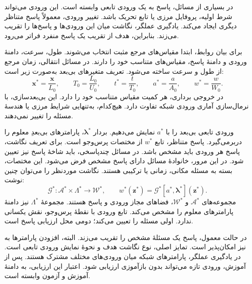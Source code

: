 \label{sec:lit-operator-learning}

\label{sec:lit-operator-concept}

در بسیاری از مسائل، پاسخ به یک ورودی تابعی وابسته است.
این ورودی می‌تواند شرط اولیه، پروفایل مرزی یا تابع تحریک باشد.
تغییر ورودی، معمولاً پاسخ متناظر دیگری ایجاد می‌کند.
یادگیری عملگر، نگاشت میان این ورودی‌ها و پاسخ‌ها را تقریب می‌زند.
بنابراین، هدف از تقریب یک پاسخ منفرد فراتر می‌رود.
\cite{Kovachki2023NeuralOperator}

برای بیان روابط، ابتدا مقیاس‌های مرجع مثبت انتخاب می‌شوند.
طول، سرعت، دامنهٔ ورودی و دامنهٔ پاسخ، مقیاس‌های متناسب خود را دارند.
در مسائل انتقالی، زمان مرجع از طول و سرعت ساخته می‌شود.
تعریف متغیرهای بی‌بعد به‌صورت زیر است:
\begin{equation}
\mathbf{x}^{*}=\frac{\mathbf{x}}{L_0},
\qquad T_0=\frac{L_0}{U_0},
\qquad t^{*}=\frac{t}{T_0},
\qquad a^{*}=\frac{a}{A_0},
\qquad w^{*}=\frac{w}{W_0}.
\label{eq:lit-operator-scales}
\end{equation}
در خروجی برداری، هر کمیت مقیاس متناسب خود را دارد.
این بی‌بعدسازی، با نرمال‌سازی آماری ورودی شبکه تفاوت دارد.
هیچ‌کدام، به‌تنهایی شرایط مرزی یا هندسهٔ مسئله را تغییر نمی‌دهند.

ورودی تابعی بی‌بعد را با $a^{*}$ نمایش می‌دهیم.
بردار $\boldsymbol{\lambda}^{*}$، پارامترهای بی‌بعدِ معلوم را دربرمی‌گیرد.
پاسخ متناظر، تابع $w^{*}$ از مختصات پرس‌وجو است.
برای تعریف نگاشت، پاسخ هر ورودی باید مشخص باشد.
در مسائل چندپاسخی، باید شاخهٔ پاسخ نیز تعیین شود.
در این مرور، خانوادهٔ مسائل دارای پاسخ مشخص فرض می‌شود.
این مختصات، بسته به مسئله مکانی، زمانی یا ترکیبی هستند.
نگاشت موردنظر را می‌توان چنین نوشت:
\begin{equation}
\mathcal{G}^{*}:\mathcal{A}^{*}\times\Lambda^{*}\longrightarrow\mathcal{W}^{*},
\qquad
w^{*}(\mathbf{z}^{*})
=\mathcal{G}^{*}[a^{*},\boldsymbol{\lambda}^{*}](\mathbf{z}^{*}).
\label{eq:lit-operator-map}
\end{equation}
مجموعه‌های $\mathcal{A}^{*}$ و $\mathcal{W}^{*}$، فضاهای مجاز ورودی و پاسخ هستند.
مجموعهٔ $\Lambda^{*}$ نیز دامنهٔ پارامترهای معلوم را مشخص می‌کند.
تابع ورودی با نقطهٔ پرس‌وجو، نقش یکسانی ندارد.
اولی مسئله را تعیین می‌کند؛ دومی محل ارزیابی پاسخ است.
\cite{lu2021deeponet}

در حالت معمول،  پاسخ یک مسئلهٔ مشخص را تقریب می‌زند.
البته، افزودن پارامترها به  نیز امکان‌پذیر است.
تمایز اصلی، نوع نگاشت هدف و نحوهٔ نمایش ورودی تابعی است.
در یادگیری عملگر، پارامترهای شبکه میان ورودی‌های مختلف مشترک هستند.
پس از آموزش، ورودی تازه می‌تواند بدون بازآموزی ارزیابی شود.
اعتبار این ارزیابی، به دامنهٔ آموزش و آزمون وابسته است.
\cite{wang2021pideeponet,Kovachki2023NeuralOperator}

